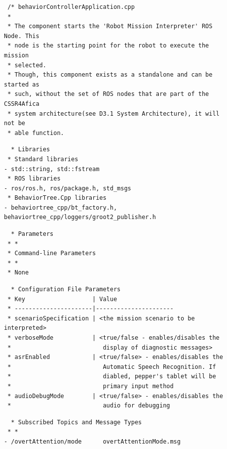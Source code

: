 \documentclass{CSSRforAfrica}
\newcommand{\checkboxChecked}{\fbox{\ding{51}}} %
\begin{document}
\begin{description}

\item[\checkboxChecked] 
 {\small 
\begin{verbatim}
 /* behaviorControllerApplication.cpp
 *
 * The component starts the 'Robot Mission Interpreter' ROS Node. This
 * node is the starting point for the robot to execute the mission
 * selected.
 * Though, this component exists as a standalone and can be started as
 * such, without the set of ROS nodes that are part of the CSSR4Afica
 * system architecture(see D3.1 System Architecture), it will not be
 * able function.
\end{verbatim}}

\item[\checkboxChecked] 
 {\small 
\begin{verbatim}
  * Libraries
 * Standard libraries
- std::string, std::fstream
 * ROS libraries
- ros/ros.h, ros/package.h, std_msgs
 * BehaviorTree.Cpp libraries
- behaviortree_cpp/bt_factory.h, behaviortree_cpp/loggers/groot2_publisher.h
\end{verbatim}}

\item[\checkboxChecked] 
 {\small 
\begin{verbatim}
  * Parameters
 * *
 * Command-line Parameters
 * *
 * None
\end{verbatim}}


\item[\checkboxChecked] 
 {\small 
\begin{verbatim}
  * Configuration File Parameters
 * Key                   | Value
 * ----------------------|----------------------
 * scenarioSpecification | <the mission scenario to be interpreted>
 * verboseMode           | <true/false - enables/disables the
 *                          display of diagnostic messages>
 * asrEnabled            | <true/false> - enables/disables the
 *                          Automatic Speech Recognition. If
 *                          diabled, pepper's tablet will be
 *                          primary input method
 * audioDebugMode        | <true/false> - enables/disables the
 *                          audio for debugging
\end{verbatim}}

\item[\checkboxChecked] 
 {\small 
\begin{verbatim}
  * Subscribed Topics and Message Types
 * *
- /overtAttention/mode      overtAttentionMode.msg
\end{verbatim}}


\end{description}
\end{document}
